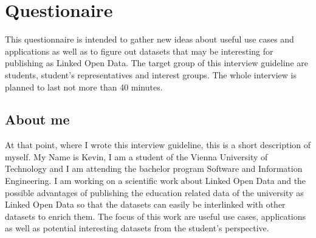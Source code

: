 \documentclass{article}
\begin{document}
\printbibliography[title={References to refereed scientific work}, keyword=refsw]

\printbibliography[title={References to non-refereed work}, keyword=nonrefw]

\printbibliography[title={References to websites}, type=misc]

\newpage
\appendix


\section{Questionaire}
\label{questionaire}
This questionnaire is intended to gather new ideas about useful use cases and applications as well as to figure out datasets that may be interesting for publishing as Linked Open Data. The target group of this interview guideline are students, student’s representatives and interest groups. The whole interview is planned to last not more than 40 minutes.

\subsection{About me}
\label{questionaire:about-me}
At that point, where I wrote this interview guideline, this is a short description of myself. My Name is Kevin, I am a student of the Vienna University of Technology and I am attending the bachelor program Software and Information Engineering. I am working on a scientific work about Linked Open Data and the possible advantages of publishing the education related data of the university as Linked Open Data so that the datasets can easily be interlinked with other datasets to enrich them. The focus of this work are useful use cases, applications as well as potential interesting datasets from the student’s perspective.
\end{document}
